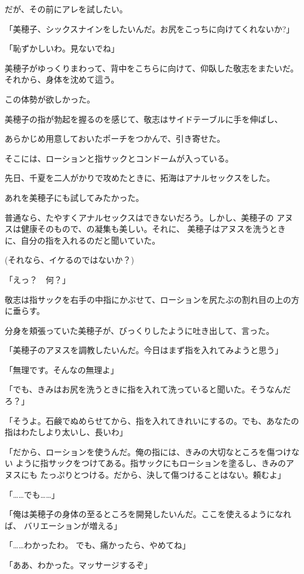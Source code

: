 ﻿\documentclass[
    book,tate,
    line_length=30zw,
    jafontsize=12pt,
    paper=b5j,
    landscape,
    ]{jlreq}
\begin{document}
だが、その前にアレを試したい。

「美穂子、シックスナインをしたいんだ。お尻をこっちに向けてくれないか?」

「恥ずかしいわ。見ないでね」

美穂子がゆっくりまわって、背中をこちらに向けて、仰臥した敬志をまたいだ。
それから、身体を沈めて這う。

この体勢が欲しかった。

美穂子の指が勃起を握るのを感じて、敬志はサイドテーブルに手を伸ばし、

あらかじめ用意しておいたポーチをつかんで、引き寄せた。

そこには、ローションと指サックとコンドームが入っている。

先日、千夏を二人がかりで攻めたときに、拓海はアナルセックスをした。

あれを美穂子にも試してみたかった。

普通なら、たやすくアナルセックスはできないだろう。しかし、美穂子の
アヌスは健康そのもので、の凝集も美しい。それに、
美穂子はアヌスを洗うときに、自分の指を入れるのだと聞いていた。

(それなら、イケるのではないか？)

「えっ？　何？」

敬志は指サックを右手の中指にかぶせて、ローションを尻たぶの割れ目の上の方に垂らす。

分身を頬張っていた美穂子が、びっくりしたように吐き出して、言った。

「美穂子のアヌスを調教したいんだ。今日はまず指を入れてみようと思う」

「無理です。そんなの無理よ」

「でも、きみはお尻を洗うときに指を入れて洗っていると聞いた。そうなんだろ？」

「そうよ。石鹸でぬめらせてから、指を入れてきれいにするの。でも、あなたの
指はわたしより太いし、長いわ」

「だから、ローションを使うんだ。俺の指には、きみの大切なところを傷つけない
ように指サックをつけてある。指サックにもローションを塗るし、きみのアヌスにも
たっぷりとつける。だから、決して傷つけることはない。頼むよ」

「……でも……」

「俺は美穂子の身体の至るところを開発したいんだ。ここを使えるようになれば、
バリエーションが増える」

「……わかったわ。 でも、痛かったら、やめてね」

「ああ、わかった。マッサージするぞ」
\end{document}
